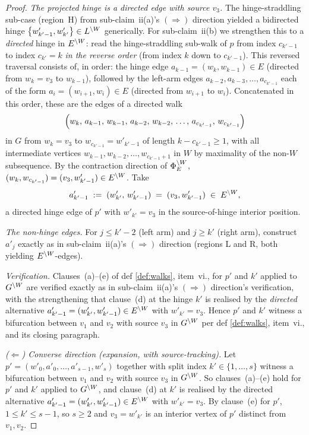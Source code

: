 \documentclass[main]{subfiles}
\begin{document}
\begin{proof}
\emph{The projected hinge is a directed edge with source $v_3$.}
The hinge-straddling sub-case (region~H) from sub-claim~ii(a)'s $(\Rightarrow)$ direction yielded a bidirected hinge $\left \{ w'_{k'-1}, w'_{k'} \right \} \in L^{\setminus W}$ generically. For sub-claim~ii(b) we strengthen this to a \emph{directed} hinge in $E^{\setminus W}$: read the hinge-straddling sub-walk of $p$ from index $c_{k'-1}$ to index $c_{k'} = k$ \emph{in the reverse order} (from index $k$ down to $c_{k'-1}$). This reversed traversal consists of, in order: the hinge edge $a_{k-1} = (w_k, w_{k-1}) \in E$ (directed from $w_k = v_3$ to $w_{k-1}$), followed by the left-arm edges $a_{k-2}, a_{k-3}, \dots, a_{c_{k'-1}}$ each of the form $a_i = (w_{i+1}, w_i) \in E$ (directed from $w_{i+1}$ to $w_i$). Concatenated in this order, these are the edges of a directed walk
\[
    \left ( w_k,\, a_{k-1},\, w_{k-1},\, a_{k-2},\, w_{k-2},\, \dots,\, a_{c_{k'-1}},\, w_{c_{k'-1}} \right )
\]
in $G$ from $w_k = v_3$ to $w_{c_{k'-1}} = w'_{k'-1}$ of length $k - c_{k'-1} \ge 1$, with all intermediate vertices $w_{k-1}, w_{k-2}, \dots, w_{c_{k'-1} + 1}$ in $W$ by maximality of the non-$W$ subsequence. By the contraction direction of $\Phi_E^{\setminus W}$, $(w_k, w_{c_{k'-1}}) = (v_3, w'_{k'-1}) \in E^{\setminus W}$. Take
\[
    a'_{k'-1} \;:=\; (w'_{k'},\, w'_{k'-1}) \;=\; (v_3, w'_{k'-1}) \;\in\; E^{\setminus W},
\]
a directed hinge edge of $p'$ with $w'_{k'} = v_3$ in the source-of-hinge interior position.

\emph{The non-hinge edges.} For $j \le k' - 2$ (left arm) and $j \ge k'$ (right arm), construct $a'_j$ exactly as in sub-claim~ii(a)'s $(\Rightarrow)$ direction (regions L and R, both yielding $E^{\setminus W}$-edges).

\emph{Verification.} Clauses~(a)--(e) of def \ref{def:walks}, item~vi., for $p'$ and $k'$ applied to $G^{\setminus W}$ are verified exactly as in sub-claim~ii(a)'s $(\Rightarrow)$ direction's verification, with the strengthening that clause~(d) at the hinge $k'$ is realised by the \emph{directed} alternative $a'_{k'-1} = (w'_{k'}, w'_{k'-1}) \in E^{\setminus W}$ with $w'_{k'} = v_3$. Hence $p'$ and $k'$ witness a bifurcation between $v_1$ and $v_2$ with source $v_3$ in $G^{\setminus W}$ per def \ref{def:walks}, item~vi., and its closing paragraph.

\smallskip\noindent\emph{($\Leftarrow$) Converse direction (expansion, with source-tracking).}
Let $p' = (w'_0, a'_0, \dots, a'_{s-1}, w'_s)$ together with split index $k' \in \{1, \dots, s\}$ witness a bifurcation between $v_1$ and $v_2$ with source $v_3$ in $G^{\setminus W}$. So clauses~(a)--(e) hold for $p'$ and $k'$ applied to $G^{\setminus W}$, and clause~(d) at $k'$ is realised by the directed alternative $a'_{k'-1} = (w'_{k'}, w'_{k'-1}) \in E^{\setminus W}$ with $w'_{k'} = v_3$. By clause~(e) for $p'$, $1 \le k' \le s - 1$, so $s \ge 2$ and $v_3 = w'_{k'}$ is an interior vertex of $p'$ distinct from $v_1, v_2$.


\end{proof}
\end{document}
